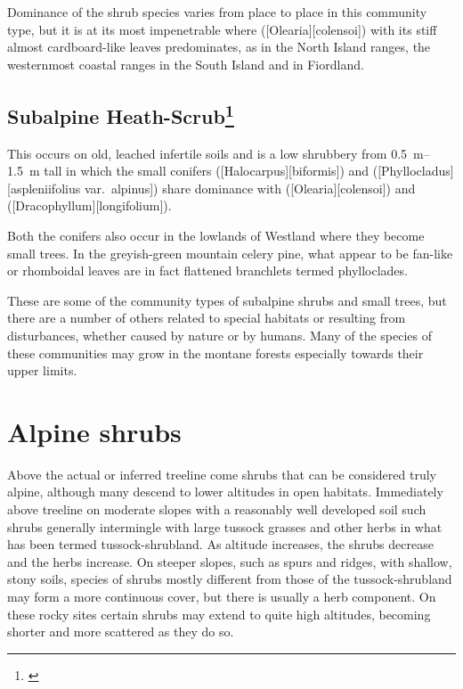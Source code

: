 Dominance of the shrub species varies from place to place in this community type, but it is at its most impenetrable where  ([Olearia][colensoi]) with its stiff almost cardboard-like leaves predominates, as in the North Island ranges, the westernmost coastal ranges in the South Island and in Fiordland.

\subsection[Subalpine Heath-Scrub]{Subalpine Heath-Scrub\thinspace\footnote{\cite{burrows1979heathlands}}}

This occurs on old, leached infertile soils and is a low shrubbery from \SIrange{0.5}{1.5}{\metre} tall in which the small conifers  ([Halocarpus][biformis]) and  ([Phyllocladus][aspleniifolius var.\ alpinus]) share dominance with  ([Olearia][colensoi]) and  ([Dracophyllum][longifolium]).

Both the conifers also occur in the lowlands of Westland where they become small trees.
In the greyish-green mountain celery pine, what appear to be fan-like or rhomboidal leaves are in fact flattened branchlets termed phylloclades.

These are some of the community types of subalpine shrubs and small trees, but there are a number of others related to special habitats or resulting from disturbances, whether caused by nature or by humans.
Many of the species of these communities may grow in the montane forests especially towards their upper limits.

\section{Alpine shrubs}

Above the actual or inferred treeline come shrubs that can be considered truly alpine, although many descend to lower altitudes in open habitats.
Immediately above treeline on moderate slopes with a reasonably well developed soil such shrubs generally intermingle with large tussock grasses and other herbs in what has been termed tussock-shrubland.
As altitude increases, the shrubs decrease and the herbs increase.
On steeper slopes, such as spurs and ridges, with shallow, stony soils, species of shrubs mostly different from those of the tussock-shrubland may form a more continuous cover, but there is usually a herb component.
On these rocky sites certain shrubs may extend to quite high altitudes, becoming shorter and more scattered as they do so.

